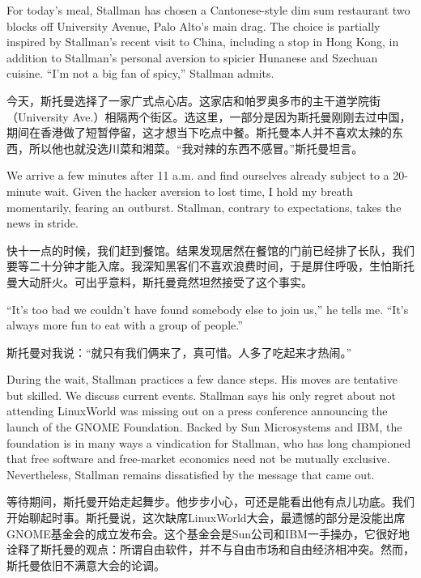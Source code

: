 \ifdefined\eng
For today's meal, Stallman has chosen a Cantonese-style dim sum restaurant two blocks off University Avenue, Palo Alto's main drag. The choice is partially inspired by Stallman's recent visit to China, including a stop in Hong Kong, in addition to Stallman's personal aversion to spicier Hunanese and Szechuan cuisine. ``I'm not a big fan of spicy,'' Stallman admits.
\fi

\ifdefined\chs
今天，斯托曼选择了一家广式点心店。这家店和帕罗奥多市的主干道学院街（University
Ave.）相隔两个街区。选这里，一部分是因为斯托曼刚刚去过中国，期间在香港做了短暂停留，这才想当下吃点中餐。斯托曼本人并不喜欢太辣的东西，所以他也就没选川菜和湘菜。``我对辣的东西不感冒。''斯托曼坦言。
\fi

\ifdefined\eng
We arrive a few minutes after 11 a.m. and find ourselves already subject to a 20-minute wait. Given the hacker aversion to lost time, I hold my breath momentarily, fearing an outburst. Stallman, contrary to expectations, takes the news in stride.
\fi

\ifdefined\chs
快十一点的时候，我们赶到餐馆。结果发现居然在餐馆的门前已经排了长队，我们要等二十分钟才能入席。我深知黑客们不喜欢浪费时间，于是屏住呼吸，生怕斯托曼大动肝火。可出乎意料，斯托曼竟然坦然接受了这个事实。
\fi

\ifdefined\eng
``It's too bad we couldn't have found somebody else to join us,'' he tells me. ``It's always more fun to eat with a group of people.''
\fi

\ifdefined\chs
斯托曼对我说：``就只有我们俩来了，真可惜。人多了吃起来才热闹。''
\fi

\ifdefined\eng
During the wait, Stallman practices a few dance steps. His moves are tentative but skilled. We discuss current events. Stallman says his only regret about not attending LinuxWorld was missing out on a press conference announcing the launch of the GNOME Foundation. Backed by Sun Microsystems and IBM, the foundation is in many ways a vindication for Stallman, who has long championed that free software and free-market economics need not be mutually exclusive. Nevertheless, Stallman remains dissatisfied by the message that came out.
\fi

\ifdefined\chs
等待期间，斯托曼开始走起舞步。他步步小心，可还是能看出他有点儿功底。我们开始聊起时事。斯托曼说，这次缺席LinuxWorld大会，最遗憾的部分是没能出席GNOME基金会的成立发布会。这个基金会是Sun公司和IBM一手操办，它很好地诠释了斯托曼的观点：所谓自由软件，并不与自由市场和自由经济相冲突。然而，斯托曼依旧不满意大会的论调。
\fi

